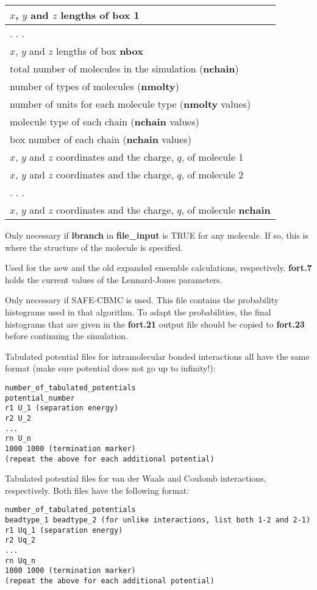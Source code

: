 \documentclass[12pt,letterpaper]{article}
\begin{document}
\begin{center}
\begin{tabular}{| l |}
$x$, $y$ and $z$ lengths of box 1  \\ \hline
  . . . \\ \hline
$x$, $y$ and $z$ lengths of box {\bf nbox} \\ \hline
total number of molecules in the simulation ({\bf nchain}) \\ \hline
number of types of molecules ({\bf nmolty}) \\ \hline
number of units for each molecule type ({\bf nmolty} values) \\ \hline
molecule type of each chain ({\bf nchain} values) \\ \hline
box number of each chain ({\bf nchain} values) \\ \hline
$x$, $y$ and $z$ coordinates and the charge, $q$, of molecule 1 \\ \hline
$x$, $y$ and $z$ coordinates and the charge, $q$, of molecule 2 \\ \hline
  . . . \\ \hline
$x$, $y$ and $z$ coordinates and the charge, $q$, of molecule {\bf nchain} \\
  \hline
\end{tabular}
\end{center}

 Only necessary if {\bf lbranch}
in {\bf file\_input} is TRUE for any molecule. If so, this
is where the structure of the molecule is specified.

 Used for the new and the old
expanded ensemble calculations, respectively. {\bf fort.7}
holds the current values of the Lennard-Jones parameters.

 Only necessary if SAFE-CBMC is used.
This file contains the probability histograms used in that
algorithm. To adapt the probabilities, the final histograms
that are given in the {\bf fort.21} output file should be
copied to {\bf fort.23} before continuing the simulation.

 Tabulated potential
files for intramolecular bonded interactions all have the
same format (make sure potential does not go up to
infinity!):
\begin{verbatim}
number_of_tabulated_potentials
potential_number
r1 U_1 (separation energy)
r2 U_2
...
rn U_n
1000 1000 (termination marker)
(repeat the above for each additional potential)
\end{verbatim}

 Tabulated potential files
for van der Waals and Coulomb interactions, respectively.
Both files have the following format:
\begin{verbatim}
number_of_tabulated_potentials
beadtype_1 beadtype_2 (for unlike interactions, list both 1-2 and 2-1)
r1 Uq_1 (separation energy)
r2 Uq_2
...
rn Uq_n
1000 1000 (termination marker)
(repeat the above for each additional potential)
\end{verbatim}
\end{document}
